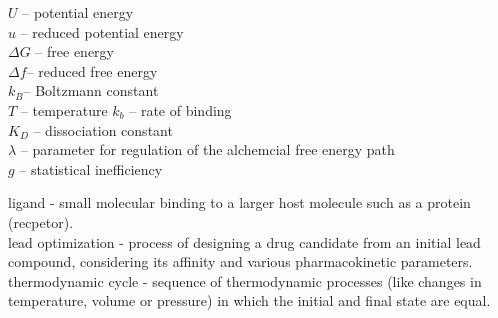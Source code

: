 \documentclass[9pt,bestpractices]{livecoms}
\begin{document}
\begin{tcolorbox}[title=List of Symbols, colback=green!10!white]
$U$ -- potential energy\\
$u$ -- reduced potential energy \\
$\Delta G$ -- free energy \\
$\Delta f$-- reduced free energy \\
$k_B$-- Boltzmann constant \\
$T$ -- temperature
$k_b$ -- rate of binding \\
$K_D$ -- dissociation constant \\
$\lambda$ -- parameter for regulation of the alchemcial free energy path \\
$g$ -- statistical inefficiency
\end{tcolorbox}
\begin{tcolorbox}[title=Common terminology, colback=yellow!10!white]
    ligand - small molecular binding to a larger host molecule such as a protein (recpetor).\\ 
    lead optimization - process of designing a drug candidate from an initial lead compound, considering its affinity and various pharmacokinetic parameters.\\
    thermodynamic cycle - sequence of thermodynamic processes (like changes in temperature, volume or pressure) in which the initial and final state are equal.\\
\end{tcolorbox}
%
\end{document}
